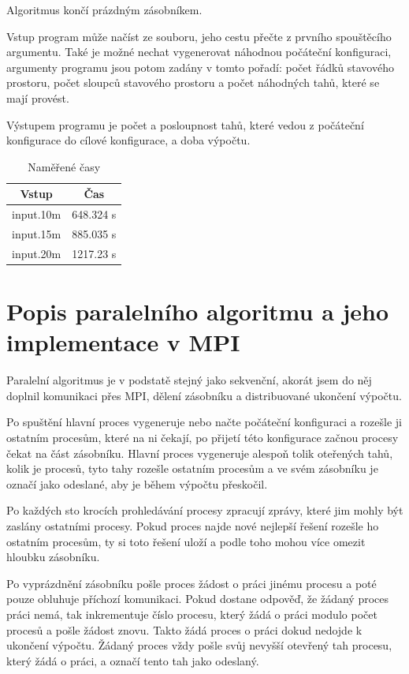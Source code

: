 \documentclass[12pt]{article}
\begin{document}
Algoritmus končí prázdným zásobníkem.

Vstup program může načíst ze souboru, jeho cestu přečte z prvního spouštěcího argumentu. Také je možné nechat vygenerovat náhodnou počáteční konfiguraci, argumenty programu jsou potom zadány v tomto pořadí: počet řádků stavového prostoru, počet sloupců stavového prostoru a počet náhodných tahů, které se mají provést.

Výstupem programu je počet a posloupnost tahů, které vedou z počáteční konfigurace do cílové konfigurace, a doba výpočtu.

\begin{table}[ht]
\begin{center}
\begin{tabular}{c|c}
  Vstup & Čas \\
  \hline
  input.10m & 648.324 s \\
  input.15m & 885.035 s \\
  input.20m & 1217.23 s \\
\end{tabular}
\end{center}
\caption{Naměřené časy}
\end{table}

\section{Popis paralelního algoritmu a jeho implementace v MPI}

Paralelní algoritmus je v podstatě stejný jako sekvenční, akorát jsem do něj doplnil komunikaci přes MPI, dělení zásobníku a distribuované ukončení výpočtu.

Po spuštění hlavní proces vygeneruje nebo načte počáteční konfiguraci a rozešle ji ostatním procesům, které na ni čekají, po přijetí této konfigurace začnou procesy čekat na část zásobníku. Hlavní proces vygeneruje alespoň tolik oteřených tahů, kolik je procesů, tyto tahy rozešle ostatním procesům a ve svém zásobníku je označí jako odeslané, aby je během výpočtu přeskočil.

Po každých sto krocích prohledávání procesy zpracují zprávy, které jim mohly být zaslány ostatními procesy. Pokud proces najde nové nejlepší řešení rozešle ho ostatním procesům, ty si toto řešení uloží a podle toho mohou více omezit hloubku zásobníku.

Po vyprázdnění zásobníku pošle proces žádost o práci jinému procesu a poté pouze obluhuje příchozí komunikaci. Pokud dostane odpověď, že žádaný proces práci nemá, tak inkrementuje číslo procesu, který žádá o práci modulo počet procesů a pošle žádost znovu. Takto žádá proces o práci dokud nedojde k ukončení výpočtu. Žádaný proces vždy pošle svůj nevyšší otevřený tah procesu, který žádá o práci, a označí tento tah jako odeslaný.
\end{document}

